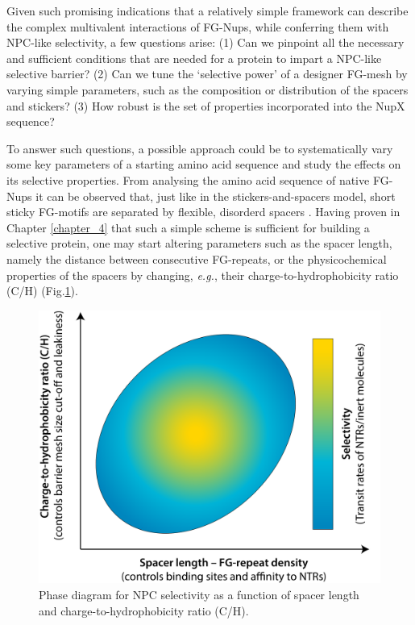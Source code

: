Given such promising indications that a relatively simple framework can describe the complex multivalent interactions of FG-Nups, while conferring them with NPC-like selectivity, a few questions arise: (1) Can we pinpoint all the necessary and sufficient conditions that are needed for a protein to impart a NPC-like selective barrier? (2) Can we tune the `selective power' of a designer FG-mesh by varying simple parameters, such as the composition or distribution of the spacers and stickers? (3) How robust is the set of properties incorporated into the NupX sequence? 

To answer such questions, a possible approach could be to systematically vary some key parameters of a starting amino acid sequence and study the effects on its selective properties. From analysing the amino acid sequence of native FG-Nups  it can be observed that, just like in the stickers-and-spacers model, short sticky FG-motifs are separated by flexible, disorderd spacers \cite{Terry2009}. Having proven in Chapter \ref{chapter_4} that such a simple scheme is sufficient for building a selective protein, one may start altering parameters such as the spacer length, namely the distance between consecutive FG-repeats, or the physicochemical properties of the spacers by changing, \emph{e.g.}, their charge-to-hydropho\-bi\-ci\-ty ratio (C/H) (Fig.\ref{fig:fig8.2}). 

\begin{figure}[!htbp]
	\centering
	\includegraphics[width=0.9\linewidth]{figures/Figure8.2.pdf}
	\caption{Phase diagram for NPC selectivity as a function of spacer length and charge-to-hydrophobicity ratio (C/H).}
	\label{fig:fig8.2}
\end{figure}

